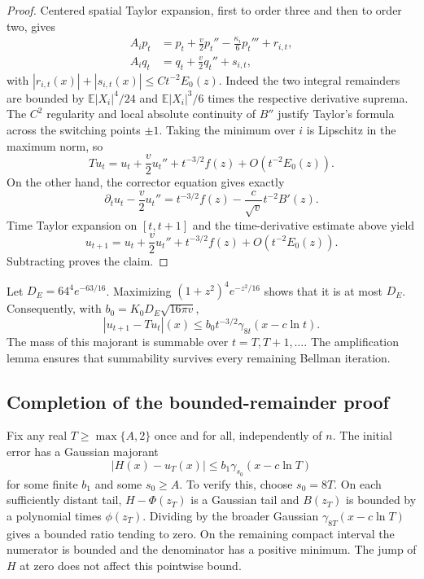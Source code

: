 \documentclass[11pt,a4paper]{article}
\theoremstyle{definition}\newtheorem{definition}[theorem]{Definition}
\theoremstyle{remark}\newtheorem{remark}[theorem]{Remark}
\newcommand{\E}{\mathbb E}
\numberwithin{equation}{section}
\begin{document}
\begin{proof}
Centered spatial Taylor expansion, first to order three and then to
order two, gives
\begin{align*}
 A_i p_t&=p_t+\frac v2p_t''-\frac{\kappa_i}{6}p_t'''+r_{i,t},\\
 A_i q_t&=q_t+\frac v2q_t''+s_{i,t},
\end{align*}
with $|r_{i,t}(x)|+|s_{i,t}(x)|\le Ct^{-2}E_0(z)$.
Indeed the two integral remainders are bounded by
$\E|X_i|^4/24$ and $\E|X_i|^3/6$ times the respective derivative
suprema. The $C^2$ regularity and local absolute continuity of $B''$
justify Taylor's formula across the switching points $\pm1$.
Taking the minimum over $i$ is Lipschitz in the maximum norm, so
\[
 Tu_t=u_t+\frac v2u_t''+t^{-3/2}f(z)+O(t^{-2}E_0(z)).
\]
On the other hand, the corrector equation gives exactly
\[
 \partial_tu_t-\frac v2u_t''
   =t^{-3/2}f(z)-\frac c{\sqrt v}t^{-2}B'(z).
\]
Time Taylor expansion on $[t,t+1]$ and the time-derivative estimate above yield
\[
 u_{t+1}=u_t+\frac v2u_t''+t^{-3/2}f(z)+O(t^{-2}E_0(z)).
\]
Subtracting proves the claim.
\end{proof}

Let $D_E=64^4e^{-63/16}$. Maximizing
$(1+z^2)^4e^{-z^2/16}$ shows that it is at most $D_E$. Consequently,
with $b_0=K_0D_E\sqrt{16\pi v}$,
\begin{equation}\label{log:eq:gaussres}
 |u_{t+1}-Tu_t|(x)\le b_0t^{-3/2}\gamma_{8t}(x-c\ln t).
\end{equation}
The mass of this majorant is summable over $t=T,T+1,\ldots$.
The amplification lemma ensures that summability survives every remaining
Bellman iteration.

\subsection{Completion of the bounded-remainder proof}
Fix any real $T\ge\max\{A,2\}$ once and for all, independently of $n$.
The initial error has a Gaussian majorant
\begin{equation}\label{log:eq:initial}
 |H(x)-u_T(x)|\le b_1\gamma_{s_0}(x-c\ln T)
\end{equation}
for some finite $b_1$ and some $s_0\ge A$.
To verify this, choose $s_0=8T$. On each sufficiently distant tail,
$H-\Phi(z_T)$ is a Gaussian tail and $B(z_T)$ is bounded by a
polynomial times $\phi(z_T)$. Dividing by the broader Gaussian
$\gamma_{8T}(x-c\ln T)$ gives a bounded ratio tending to zero.
On the remaining compact interval the numerator is bounded and
the denominator has a positive minimum. The jump of $H$ at zero
does not affect this pointwise bound.
\end{document}
